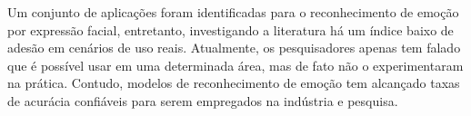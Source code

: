 
Um conjunto de aplicações foram identificadas para o reconhecimento de emoção por expressão facial, entretanto, investigando a literatura há um índice baixo de adesão em cenários de uso reais. Atualmente, os pesquisadores apenas tem falado que é possível usar em uma determinada área, mas de fato não o experimentaram na prática. Contudo, modelos de reconhecimento de emoção tem alcançado taxas de acurácia confiáveis para serem empregados na indústria e pesquisa. 



